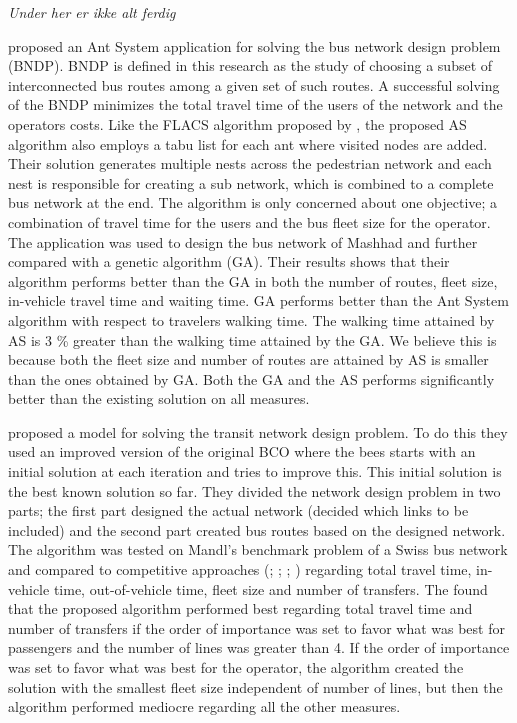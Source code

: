 \emph{\color{red}Under her er ikke alt ferdig}


\citet{poorzahedy11} proposed an Ant System application for solving the bus network design problem (BNDP). BNDP is defined in this research as the study of choosing a subset of interconnected bus routes among a given set of such routes. A successful solving of the BNDP minimizes the total travel time of the users of the network and the operators costs. Like the FLACS algorithm proposed by \citet{salehinejad10}, the proposed AS algorithm also employs a tabu list for each ant where visited nodes are added. Their solution generates multiple nests across the pedestrian network and each nest is responsible for creating a sub network, which is combined to a complete bus network at the end. The algorithm is only concerned about one objective; a combination of travel time for the users and the bus fleet size for the operator. The application was used to design the bus network of Mashhad and further compared with a genetic algorithm (GA). Their results shows that their algorithm performs better than the GA in both the number of routes, fleet size, in-vehicle travel time and waiting time. GA performs better than the Ant System algorithm with respect to travelers walking time. The walking time attained by AS is 3 \% greater than the walking time attained by the GA. We believe this is because both the fleet size and number of routes are attained by AS is smaller than the ones obtained by GA. Both the GA and the AS performs significantly better than the existing solution on all measures.  

\citet{nikolic14} proposed a model for solving the transit network design problem. To do this they used an improved version of the original BCO \citep{lucic03} where the bees starts with an initial solution at each iteration and tries to improve this. This initial solution is the best known solution so far. They divided the network design problem in two parts; the first part designed the actual network (decided which links to be included) and the second part created bus routes based on the designed network. The algorithm was tested on Mandl's benchmark problem of a Swiss bus network\citep{mandl80} and compared to competitive approaches (\citet{mandl80}; \citet{shih94}; \citet{baaj95}; \citet{bagloee11}) regarding total travel time, in-vehicle time, out-of-vehicle time, fleet size and number of transfers. The found that the proposed algorithm performed best regarding total travel time and number of transfers if the order of importance was set to favor what was best for passengers and the number of lines was greater than 4. If the order of importance was set to favor what was best for the operator, the algorithm created the solution with the smallest fleet size independent of number of lines, but then the algorithm performed mediocre regarding all the other measures. 

